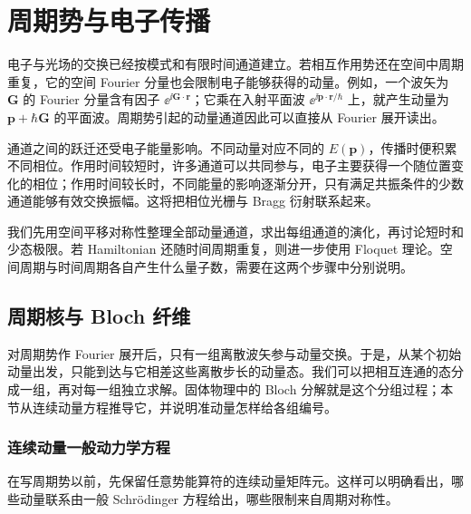 \chapter{周期势与电子传播}\label{chap:periodic-recoil}

电子与光场的交换已经按模式和有限时间通道建立。若相互作用势还在空间中周期重复，它的空间 Fourier 分量也会限制电子能够获得的动量。例如，一个波矢为 $\mathbf G$ 的 Fourier 分量含有因子 $\ee^{\ii\mathbf G\cdot\mathbf r}$；它乘在入射平面波 $\ee^{\ii\mathbf p\cdot\mathbf r/\hbar}$ 上，就产生动量为 $\mathbf p+\hbar\mathbf G$ 的平面波。周期势引起的动量通道因此可以直接从 Fourier 展开读出。

通道之间的跃迁还受电子能量影响。不同动量对应不同的 $E(\mathbf p)$，传播时便积累不同相位。作用时间较短时，许多通道可以共同参与，电子主要获得一个随位置变化的相位；作用时间较长时，不同能量的影响逐渐分开，只有满足共振条件的少数通道能够有效交换振幅。这将把相位光栅与 Bragg 衍射联系起来。\cite{Huang2023Recoil,KarnieliFan2023JC,Ruimy2025Perspective}

我们先用空间平移对称性整理全部动量通道，求出每组通道的演化，再讨论短时和少态极限。若 Hamiltonian 还随时间周期重复，则进一步使用 Floquet 理论。空间周期与时间周期各自产生什么量子数，需要在这两个步骤中分别说明。

\section{周期核与 Bloch 纤维}

对周期势作 Fourier 展开后，只有一组离散波矢参与动量交换。于是，从某个初始动量出发，只能到达与它相差这些离散步长的动量态。我们可以把相互连通的态分成一组，再对每一组独立求解。固体物理中的 Bloch 分解就是这个分组过程；本节从连续动量方程推导它，并说明准动量怎样给各组编号。

\subsection{连续动量一般动力学方程}

在写周期势以前，先保留任意势能算符的连续动量矩阵元。这样可以明确看出，哪些动量联系由一般 Schr\"odinger 方程给出，哪些限制来自周期对称性。

